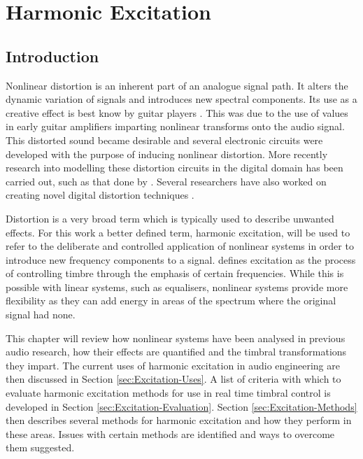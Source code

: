 
\chapter{Harmonic Excitation}
\label{chap:Excitation}

\section{Introduction}
\label{sec:Excitation-Introduction}
	Nonlinear distortion is an inherent part of an analogue signal path. It alters the dynamic variation of signals and
	introduces new spectral components. Its use as a creative effect is best know by guitar players
	\citep{dutilleux2011nonlinear}. This was due to the use of values in early guitar amplifiers imparting nonlinear
	transforms onto the audio signal. This distorted sound became desirable and several electronic circuits were
	developed with the purpose of inducing nonlinear distortion. More recently research into modelling these distortion
	circuits in the digital domain has been carried out, such as that done by \citet{pakarinen2009a}. Several
	researchers have also worked on creating novel digital distortion techniques \citep{fernandez-cid2001distortion,
	pekonen2008coefficient, puckette2007patch}.

	Distortion is a very broad term which is typically used to describe unwanted effects. For this work a better defined
	term, harmonic excitation, will be used to refer to the deliberate and controlled application of nonlinear systems
	in order to introduce new frequency components to a signal. \citet{dutilleux2011nonlinear} defines excitation as
	the process of controlling timbre through the emphasis of certain frequencies. While this is possible with linear
	systems, such as equalisers, nonlinear systems provide more flexibility as they can add energy in areas of the
	spectrum where the original signal had none.

	This chapter will review how nonlinear systems have been analysed in previous audio research, how their effects are
	quantified and the timbral transformations they impart. The current uses of harmonic excitation in audio engineering
	are then discussed in Section \ref{sec:Excitation-Uses}. A list of criteria with which to evaluate harmonic
	excitation methods for use in real time timbral control is developed in Section \ref{sec:Excitation-Evaluation}.
	Section \ref{sec:Excitation-Methods} then describes several methods for harmonic excitation and how they perform in
	these areas.  Issues with certain methods are identified and ways to overcome them suggested.


